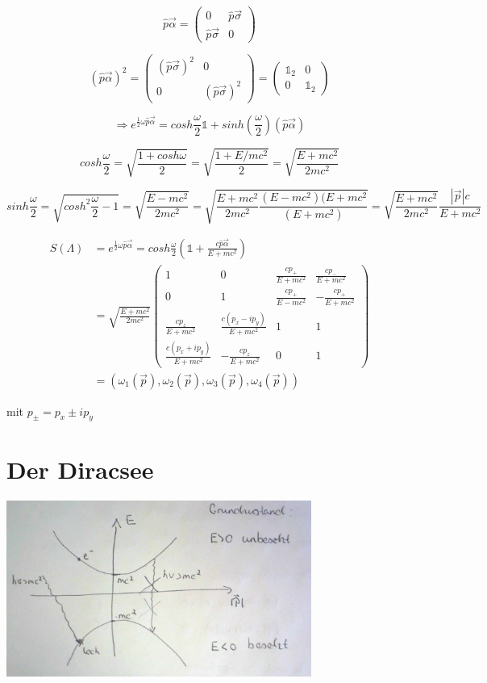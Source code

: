 \[\hat p\vec \alpha = \begin{pmatrix} 0& \hat p\vec\sigma \\ \hat p\vec \sigma& 0 \end{pmatrix} \]

\[ (\hat p\vec \alpha)^2 = \begin{pmatrix} (\hat p\vec\sigma)^2&0 \\0& (\hat p\vec \sigma)^2 \end{pmatrix} =  \begin{pmatrix} \mathbb 1_2&0 \\0& \mathbb 1_2 \end{pmatrix}  \]

\[\Rightarrow e^{\frac{1}{2}\omega\hat p\vec\alpha} = cosh\frac{\omega}{2}\mathbb 1 + sinh(\frac{\omega}{2})(\hat p\vec \alpha)\]

\[cosh\frac{\omega}{2} = \sqrt{\frac{1+cosh\omega}{2}} = \sqrt{\frac{1+E/mc^2}{2}} =  \sqrt{\frac{E+mc^2}{2mc^2}} \]


\[sinh\frac{\omega}{2} = \sqrt{cosh^2\frac{\omega}{2}-1} =  \sqrt{\frac{E-mc^2}{2mc^2}} =  \sqrt{\frac{E+mc^2}{2mc^2} \frac{(E-mc^2)(E+mc^2}{(E+mc^2)} } = \sqrt{\frac{E+mc^2}{2mc^2}} \frac{|\vec p|c}{E+mc^2}   \]

\begin{align}
S(\Lambda) &= e^{\frac{1}{2}\omega\hat p \vec\alpha} = cosh\frac{\omega}{2}(\mathbb 1 + \frac{c\hat p\vec\alpha}{E+mc^2})\\
&=\sqrt{\frac{E+mc^2}{2mc^2}} \begin{pmatrix}1&0&\frac{cp_+}{E+mc^2}&\frac{cp_-}{E+mc^2}\\0&1&\frac{cp_+}{E-mc^2} &-\frac{cp_+}{E+mc^2}\\\frac{cp_z}{E+mc^2} &\frac{c(p_x-ip_y)}{E+mc^2}&1&1\\\frac{c(p_x+ip_y)}{E+mc^2} &-\frac{cp_z}{E+mc^2} &0&1\end{pmatrix} \\
&= (\omega_1(\vec p),\omega_2(\vec p), \omega_3(\vec p),\omega_4(\vec p))
\end{align}

mit \(p_\pm = p_x\pm ip_y\)


\section{Der Diracsee}



\includegraphics[width=0.75\textwidth]{kap06_02.png}

